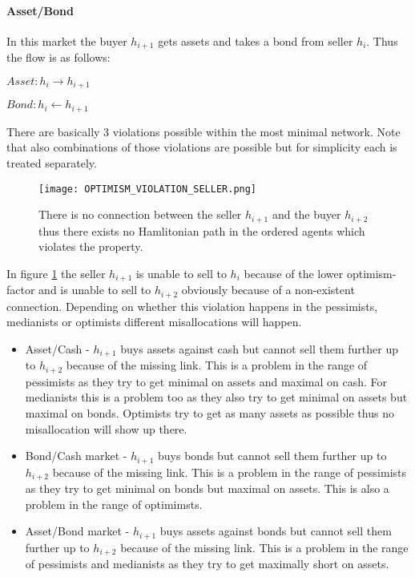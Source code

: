 \documentclass[Bachelorarbeit.tex]{subfiles}
\begin{document}
\paragraph{Asset/Bond} In this market the buyer $h_{i+1}$ gets assets and takes a bond from seller $h_i$. Thus the flow is as follows:
\begin{center}
$Asset: h_i \to h_{i+1}$
\end{center}
\begin{center}
$Bond: h_i \gets h_{i+1}$
\end{center}

\medskip

There are basically 3 violations possible within the most minimal network. Note that also combinations of those violations are possible but for simplicity each is treated separately.

\begin{figure}[H]
	\centering
  \texttt{[image: OPTIMISM\_VIOLATION\_SELLER.png]}
  	\caption{There is no connection between the seller $h_{i+1}$ and the buyer $h_{i+2}$ thus there exists no Hamlitonian path in the ordered agents which violates the property.}
	\label{fig:OPTIMISM_VIOLATION_SELLER}
\end{figure}

In figure \ref{fig:OPTIMISM_VIOLATION_SELLER} the seller $h_{i+1}$ is unable to sell to $h_i$ because of the lower optimism-factor and is unable to sell to $h_{i+2}$ obviously because of a non-existent connection. Depending on whether this violation happens in the pessimists, medianists or optimists different misallocations will happen.

\begin{itemize}
\item Asset/Cash - $h_{i+1}$ buys assets against cash but cannot sell them further up to $h_{i+2}$ because of the missing link. This is a problem in the range of pessimists as they try to get minimal on assets and maximal on cash. For medianists this is a problem too as they also try to get minimal on assets but maximal on bonds. Optimists try to get as many assets as possible thus no misallocation will show up there.
\item Bond/Cash market - $h_{i+1}$ buys bonds but cannot sell them further up to $h_{i+2}$ because of the missing link. This is a problem in the range of pessimists as they try to get minimal on bonds but maximal on assets. This is also a problem in the range of optimimsts.
\item Asset/Bond market - $h_{i+1}$ buys assets against bonds but cannot sell them further up to $h_{i+2}$ because of the missing link. This is a problem in the range of pessimists and medianists as they try to get maximally short on assets.
\end{itemize}
\end{document}
